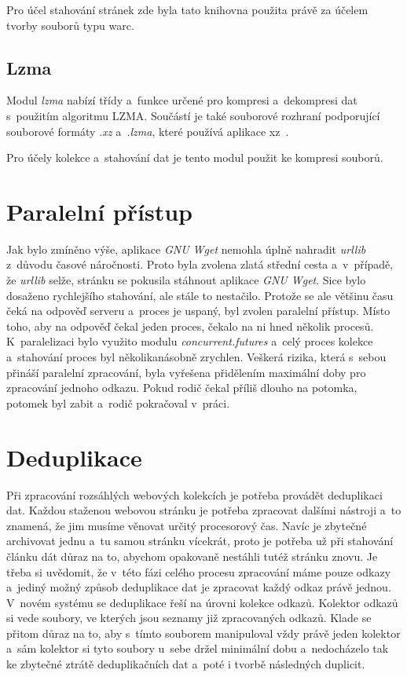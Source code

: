 Pro účel stahování stránek zde byla tato knihovna použita právě za účelem tvorby souborů
typu warc.

\subsection{Lzma}
\label{lzma}
Modul \textit{lzma} nabízí třídy a~funkce určené pro kompresi a~dekompresi dat s~použitím algoritmu LZMA.
Součástí je také souborové rozhraní podporující souborové formáty \textit{.xz} a~\textit{.lzma}, které
používá aplikace xz~\cite{LZMA}.

Pro účely kolekce a~stahování dat je tento modul použit ke kompresi souborů.

\section{Paralelní přístup}
Jak bylo zmíněno výše, aplikace \textit{GNU Wget} nemohla úplně nahradit \textit{urllib} z~důvodu časové náročnosti. Proto byla zvolena zlatá střední cesta a~v~případě,
že \textit{urllib} selže, stránku se pokusila stáhnout aplikace \textit{GNU Wget}. Sice bylo dosaženo rychlejšího stahování, ale stále to nestačilo. Protože se ale většinu
času čeká na odpověď serveru a~proces je uspaný, byl zvolen paralelní přístup. Místo toho, aby na odpověď čekal jeden proces, čekalo na ni
hned několik procesů. K~paralelizaci bylo využito modulu \textit{concurrent.futures} a~celý proces kolekce a~stahování proces byl několikanásobně zrychlen. Veškerá rizika,
která s~sebou přináší paralelní zpracování, byla vyřešena přidělením maximální doby pro zpracování jednoho odkazu. Pokud rodič čekal příliš
dlouho na potomka, potomek byl zabit a~rodič pokračoval v~práci.


\section{Deduplikace}
Při zpracování rozsáhlých webových kolekcích je potřeba provádět deduplikaci dat. Každou staženou webovou stránku je potřeba zpracovat
dalšími nástroji a~to znamená, že jim musíme věnovat určitý procesorový čas. Navíc je zbytečné archivovat jednu a~tu samou stránku
vícekrát, proto je potřeba už při stahování článku dát důraz na to, abychom opakovaně nestáhli tutéž stránku znovu.
Je třeba si uvědomit, že v~této fázi celého procesu zpracování máme pouze odkazy a~jediný možný způsob deduplikace dat je zpracovat každý
odkaz právě jednou. V~novém systému se deduplikace řeší na úrovni kolekce odkazů. Kolektor odkazů si vede soubory, ve kterých jsou seznamy již
zpracovaných odkazů. Klade se přitom důraz na to, aby s~tímto souborem manipuloval vždy právě jeden kolektor a~sám kolektor si tyto soubory
u~sebe držel minimální dobu a~nedocházelo tak ke zbytečné ztrátě deduplikačních dat a~poté i tvorbě následných duplicit.

